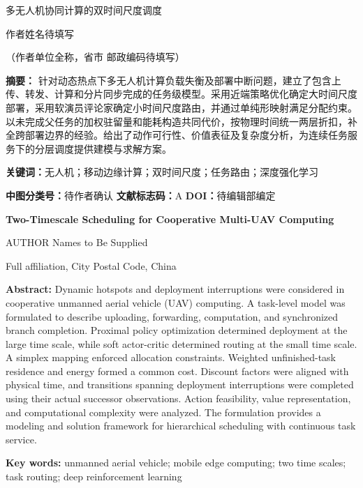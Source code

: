 \thispagestyle{empty}
\begin{center}
{\heiti\fontsize{18}{23}\selectfont 多无人机协同计算的双时间尺度调度\par}
\vspace{8mm}
{\fontsize{12}{17}\selectfont 作者姓名待填写\par}
\vspace{3mm}
{\fontsize{10.5}{15}\selectfont （作者单位全称，省市 邮政编码待填写）\par}
\end{center}
\vspace{5mm}
\noindent\textbf{摘\quad 要：}
针对动态热点下多无人机计算负载失衡及部署中断问题，建立了包含上传、转发、计算和分片同步完成的任务级模型。采用近端策略优化确定大时间尺度部署，采用软演员评论家确定小时间尺度路由，并通过单纯形映射满足分配约束。以未完成父任务的加权驻留量和能耗构造共同代价，按物理时间统一两层折扣，补全跨部署边界的经验。给出了动作可行性、价值表征及复杂度分析，为连续任务服务下的分层调度提供建模与求解方案。

\vspace{3mm}
\noindent\textbf{关键词：}无人机；移动边缘计算；双时间尺度；任务路由；深度强化学习

\vspace{3mm}
\noindent\textbf{中图分类号：}待作者确认\qquad
\textbf{文献标志码：}A\qquad
\textbf{DOI：}待编辑部编定

\vspace{10mm}
\begin{center}
{\bfseries\fontsize{15}{20}\selectfont Two-Timescale Scheduling for Cooperative Multi-UAV Computing\par}
\vspace{4mm}
{\fontsize{11}{16}\selectfont AUTHOR Names to Be Supplied\par}
\vspace{2mm}
{\fontsize{10}{14}\selectfont Full affiliation, City Postal Code, China\par}
\end{center}
\vspace{4mm}
\noindent\textbf{Abstract:}
Dynamic hotspots and deployment interruptions were considered in cooperative unmanned aerial vehicle (UAV) computing. A task-level model was formulated to describe uploading, forwarding, computation, and synchronized branch completion. Proximal policy optimization determined deployment at the large time scale, while soft actor-critic determined routing at the small time scale. A simplex mapping enforced allocation constraints. Weighted unfinished-task residence and energy formed a common cost. Discount factors were aligned with physical time, and transitions spanning deployment interruptions were completed using their actual successor observations. Action feasibility, value representation, and computational complexity were analyzed. The formulation provides a modeling and solution framework for hierarchical scheduling with continuous task service.

\vspace{4mm}
\noindent\textbf{Key words:} unmanned aerial vehicle; mobile edge computing; two time scales; task routing; deep reinforcement learning

\vfill
{}
